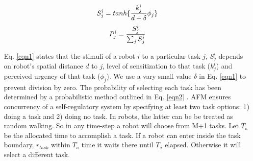\begin{multicols}{2} 
\begin{equation}
\small
S_{j}^{i} = tanh\{\frac{k_{j}^{i}}{d+\delta } \phi _{j}\}
\label{eqn1}
\end{equation}
\vspace*{0.25cm}
\begin{equation}
\small
P_{j}^{i} = \frac{S_{j}^{i}}{\sum_{j}^{}S_{j}^{i}}
\label{eqn2}
\end{equation}
\end{multicols}
Eq. \ref{eqn1} states that the stimuli of a robot $i$ to a particular task $j$, $S_{j}^{i}$ depends on robot's spatial distance $d$ to $j$, level of sensitization to that task ($k_{j}^{i}$) and perceived urgency of that task ($\phi _{j}$). We use a vary small value $\delta$ in Eq. \ref{eqn1} to prevent division by zero. The probability of selecting each task has been determined by a probabilistic method outlined in Eq. \ref{eqn2} \cite{Elsa}. 
AFM ensures concurrency of a self-regulatory system by specifying at least two task options: 1) doing a task and 2) doing no task. In robots, the latter can be be treated as random walking. So in any time-step a robot will choose from M+1 tasks. Let $T_a$ be the allocated time to accomplish a task. If a robot can enter inside the task boundary, $r_{task}$ within $T_a$ time it waits there until $T_a$ elapsed. Otherwise it will select a different task. 
